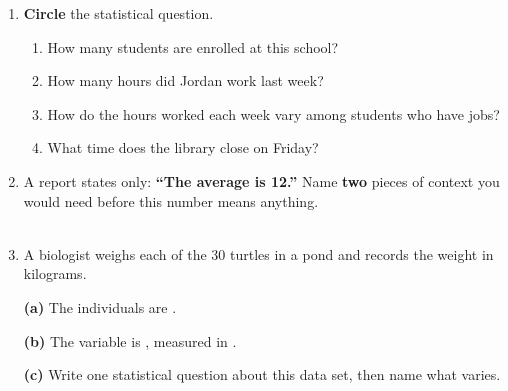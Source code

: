 \documentclass[10pt]{article}
\begin{document}

\vspace{0.15in}

\begin{enumerate}[leftmargin=1.7em, itemsep=0.20in]

  \item \textbf{Circle} the statistical question.
        \begin{enumerate}[label=\textbf{(\Alph*)}, leftmargin=2em, itemsep=4pt]
          \item How many students are enrolled at this school?
          \item How many hours did Jordan work last week?
          \item How do the hours worked each week vary among students who have jobs?
          \item What time does the library close on Friday?
        \end{enumerate}

  \item A report states only: \textbf{``The average is 12.''} Name \textbf{two} pieces
        of context you would need before this number means anything.\\[4pt]
        \writeline\\[1pt]\writeline

  \item A biologist weighs each of the 30 turtles in a pond and records the weight in
        kilograms.
        \vspace{6pt}

        \textbf{(a)} The individuals are \blank{6.5cm}.

        \vspace{6pt}
        \textbf{(b)} The variable is \blank{5cm}, measured in \blank{3.5cm}.

        \vspace{8pt}
        \textbf{(c)} Write one statistical question about this data set, then name what
        varies.\\[4pt]
        \writeline\\[1pt]\writeline

\end{enumerate}
\end{document}
